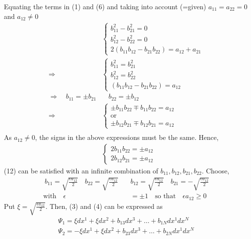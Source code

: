 Equating the terms in (1) and (6) and taking into account (=given) $a_{11}=a_{22}=0$ and $a_{12} \ne0$ 
\begin{align}
\ &\left \{ \begin{array}{l}
 b_{11}^2 - b_{21}^2 =0\\
 b_{12}^2 - b_{22}^2 =0\\
 2\left(b_{11}b_{12} - b_{21}b_{22} \right) = a_{12}+a_{21}
\end{array}\right.\\
\Rightarrow \quad \ &\left \{ \begin{array}{l}
 b_{11}^2 = b_{21}^2 \\
 b_{12}^2 = b_{22}^2 \\
 \left(b_{11}b_{12} - b_{21}b_{22} \right) =a_{12}
\end{array}\right.\\
\Rightarrow\quad b_{11} = \pm b_{21}  &\quad b_{22} =\pm b_{12}\\ 
\Rightarrow\quad  &\left \{ \begin{array}{l} 
 \pm b_{11}b_{22} \mp b_{11}b_{22}  =a_{12}\\ 
\text{or}\\
\pm b_{12}b_{21} \mp b_{12}b_{21}  =a_{12}
\end{array}\right.\\
\end{align}
As $a_{12} \ne0$, the signs in the above expressions must be the same. Hence,
\begin{align}
&\left \{ \begin{array}{c} 
 2b_{11}b_{22} =\pm a_{12}\\ 
2 b_{12}b_{21} =\pm a_{12} 
\end{array}\right.
\end{align}
(12) can be satisfied with an infinite combination of $b_{11},b_{12},b_{21}, b_{22}$. Choose,
\begin{align} 
\ b_{11} = \sqrt{\frac{\epsilon a_{12}}{2 }}\quad b_{22} = \sqrt{\frac{\epsilon a_{12}}{2 }}\quad & b_{12} = \sqrt{\frac{\epsilon a_{12}}{2 }}\quad b_{21} = - \sqrt{\frac{\epsilon a_{12}}{2 }}\\
\text{with} \quad  \epsilon &= \pm 1\quad\text{so that}\quad \epsilon a_{12} \geq 0
\end{align}
Put $\xi = \sqrt{\frac{\epsilon a_{12}}{2 }}$. Then, (3) and (4) can be expressed as 
\begin{align}
\Psi_1 =  \xi dx^1+\xi dx^2 + b_{13}dx^3+ \dots +b_{1N}dx^1dx^N \\
\Psi_2 =  -\xi dx^1+\xi dx^2 + b_{23}dx^3+ \dots +b_{2N}dx^1dx^N 
\end{align}
